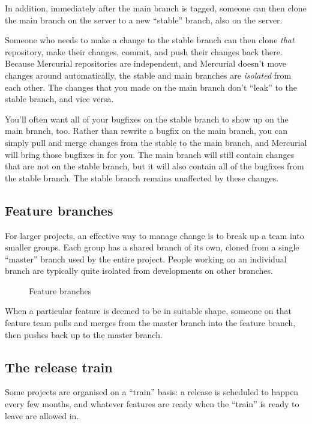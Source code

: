 In addition, immediately after the main branch is tagged, someone can
then clone the main branch on the server to a new ``stable'' branch,
also on the server.

Someone who needs to make a change to the stable branch can then clone
\emph{that} repository, make their changes, commit, and push their
changes back there.
Because Mercurial repositories are independent, and Mercurial doesn't
move changes around automatically, the stable and main branches are
\emph{isolated} from each other.  The changes that you made on the
main branch don't ``leak'' to the stable branch, and vice versa.

You'll often want all of your bugfixes on the stable branch to show up
on the main branch, too.  Rather than rewrite a bugfix on the main
branch, you can simply pull and merge changes from the stable to the
main branch, and Mercurial will bring those bugfixes in for you.
The main branch will still contain changes that are not on the stable
branch, but it will also contain all of the bugfixes from the stable
branch.  The stable branch remains unaffected by these changes.

\subsection{Feature branches}

For larger projects, an effective way to manage change is to break up
a team into smaller groups.  Each group has a shared branch of its
own, cloned from a single ``master'' branch used by the entire
project.  People working on an individual branch are typically quite
isolated from developments on other branches.

\begin{figure}[ht]
  \centering
  \caption{Feature branches}
  \label{fig:collab:feature-branches}
\end{figure}

When a particular feature is deemed to be in suitable shape, someone
on that feature team pulls and merges from the master branch into the
feature branch, then pushes back up to the master branch.

\subsection{The release train}

Some projects are organised on a ``train'' basis: a release is
scheduled to happen every few months, and whatever features are ready
when the ``train'' is ready to leave are allowed in.

